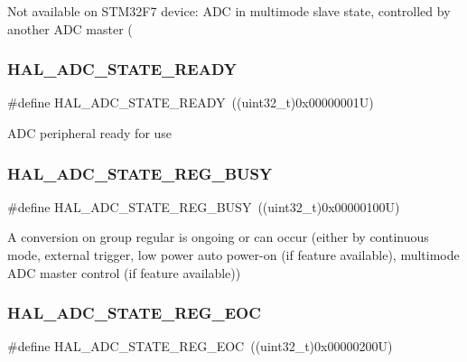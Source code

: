 Not available on S\+T\+M32\+F7 device\+: A\+DC in multimode slave state, controlled by another A\+DC master ( \mbox{\label{group___a_d_c___exported___types_gadccf2475d321f82bc5b18b4c0031794b}} 
\subsubsection{\texorpdfstring{HAL\_ADC\_STATE\_READY}{HAL\_ADC\_STATE\_READY}}
{\footnotesize\ttfamily \#define H\+A\+L\+\_\+\+A\+D\+C\+\_\+\+S\+T\+A\+T\+E\+\_\+\+R\+E\+A\+DY~((uint32\+\_\+t)0x00000001\+U)}

A\+DC peripheral ready for use \mbox{\label{group___a_d_c___exported___types_ga516d4b4ebc261c241c69d96aae19acc3}} 
\subsubsection{\texorpdfstring{HAL\_ADC\_STATE\_REG\_BUSY}{HAL\_ADC\_STATE\_REG\_BUSY}}
{\footnotesize\ttfamily \#define H\+A\+L\+\_\+\+A\+D\+C\+\_\+\+S\+T\+A\+T\+E\+\_\+\+R\+E\+G\+\_\+\+B\+U\+SY~((uint32\+\_\+t)0x00000100\+U)}

A conversion on group regular is ongoing or can occur (either by continuous mode, external trigger, low power auto power-\/on (if feature available), multimode A\+DC master control (if feature available)) \mbox{\label{group___a_d_c___exported___types_gae2da191bffb720a553a1e39c10929711}} 
\subsubsection{\texorpdfstring{HAL\_ADC\_STATE\_REG\_EOC}{HAL\_ADC\_STATE\_REG\_EOC}}
{\footnotesize\ttfamily \#define H\+A\+L\+\_\+\+A\+D\+C\+\_\+\+S\+T\+A\+T\+E\+\_\+\+R\+E\+G\+\_\+\+E\+OC~((uint32\+\_\+t)0x00000200\+U)}


